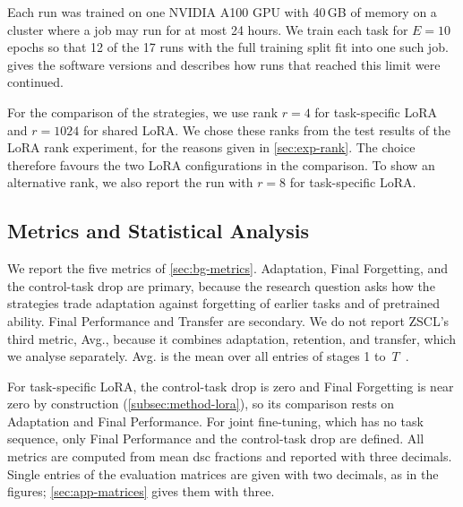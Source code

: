 Each run was trained on one NVIDIA A100 GPU with 40\,GB of memory on a cluster where a job may run for at most 24 hours.
We train each task for $E = 10$ epochs so that 12 of the 17 runs with the full training split fit into one such job.
 gives the software versions and describes how runs that reached this limit were continued.

For the comparison of the strategies, we use rank $r = 4$ for task-specific LoRA and $r = 1024$ for shared LoRA.
We chose these ranks from the test results of the LoRA rank experiment, for the reasons given in \cref{sec:exp-rank}.
The choice therefore favours the two LoRA configurations in the comparison.
To show an alternative rank, we also report the run with $r = 8$ for task-specific LoRA.

\subsection{Metrics and Statistical Analysis}
\label{subsec:exp-metrics}

We report the five metrics of \cref{sec:bg-metrics}.
Adaptation, Final Forgetting, and the control-task drop are primary, because the research question asks how the strategies trade adaptation against forgetting of earlier tasks and of pretrained ability.
Final Performance and Transfer are secondary.
We do not report ZSCL's third metric, Avg., because it combines adaptation, retention, and transfer, which we analyse separately.
Avg. is the mean over all entries of stages 1 to~$T$~\cite[Sec.~4]{zheng2023preventingzeroshottransferdegradation}.

For task-specific LoRA, the control-task drop is zero and Final Forgetting is near zero by construction (\cref{subsec:method-lora}), so its comparison rests on Adaptation and Final Performance.
For joint fine-tuning, which has no task sequence, only Final Performance and the control-task drop are defined.
All metrics are computed from mean \gls{dsc} fractions and reported with three decimals.
Single entries of the evaluation matrices are given with two decimals, as in the figures; \cref{sec:app-matrices} gives them with three.

